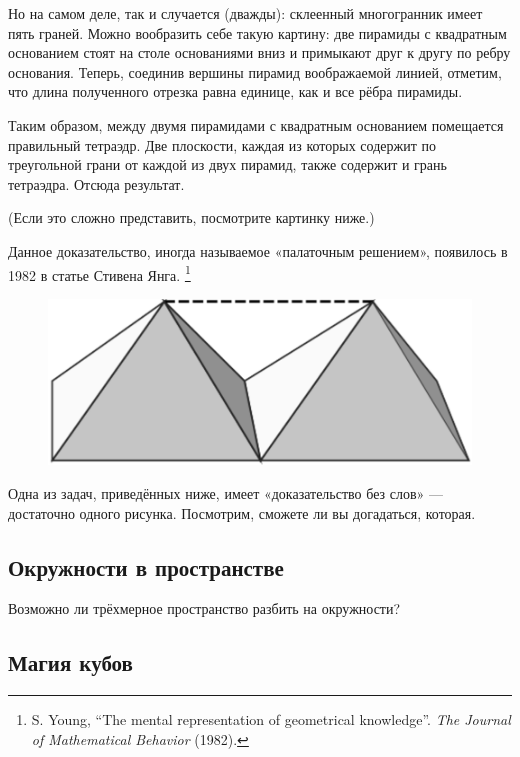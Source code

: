 Но на самом деле, так и случается (дважды):
склеенный многогранник имеет пять граней.
Можно вообразить себе такую картину: две пирамиды с квадратным основанием стоят на столе основаниями вниз и примыкают друг к другу по ребру основания.
Теперь, соединив вершины пирамид воображаемой линией, отметим, что длина полученного отрезка равна единице, как и все рёбра пирамиды.

Таким образом, между двумя пирамидами с квадратным основанием помещается правильный тетраэдр.
Две плоскости, каждая из которых содержит по треугольной грани от каждой из двух пирамид, также содержит и грань тетраэдра.
Отсюда результат.
\heart

(Если это сложно представить, посмотрите картинку ниже.)

Данное доказательство, иногда называемое «палаточным решением», появилось в 1982 в статье Стивена Янга.%
\footnote{S. Young, ``The mental representation of geometrical knowledge''. \emph{The Journal of Mathematical Behavior} (1982).}

\begin{figure}[h!]
\centering
\includegraphics[scale=0.55]{Figs/Geometry/pyrs}
\end{figure} 

Одна из задач, приведённых ниже, имеет «доказательство без слов» --- достаточно одного рисунка.
Посмотрим, сможете ли вы догадаться, которая.

\subsection*{Окружности в пространстве}%

Возможно ли трёхмерное пространство разбить на окружности? 

\subsection*{Магия кубов}%

